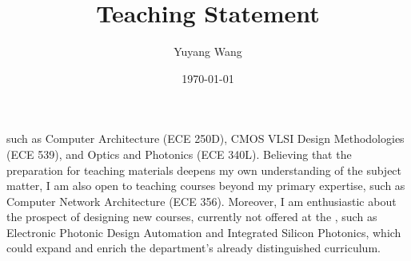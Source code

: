 



\title{Teaching Statement}

\def\courseOneName{Computer Architecture}
\def\courseOneNumber{ECE 250D}
\def\courseTwoName{CMOS VLSI Design Methodologies}
\def\courseTwoNumber{ECE 539}
\def\courseThreeName{Optics and Photonics}
\def\courseThreeNumber{ECE 340L}
\def\courseFourName{Computer Network Architecture}
\def\courseFourNumber{ECE 356}
\def\courseSixName{Electronic Photonic Design Automation}
\def\courseSevenName{Integrated Silicon Photonics}

\def\rsCustom{%
such as \courseOneName{} (\courseOneNumber{}), \courseTwoName{} (\courseTwoNumber{}), and \courseThreeName{} (\courseThreeNumber{}). Believing that the preparation for teaching materials deepens my own understanding of the subject matter, I am also open to teaching courses beyond my primary expertise, such as \courseFourName{} (\courseFourNumber{}). Moreover, I am enthusiastic about the prospect of designing new courses, currently not offered at the \appSchool{}, such as \courseSixName{} and \courseSevenName{}, which could expand and enrich the department's already distinguished curriculum.
}

\author{Yuyang Wang}
\date{\today}
\makeatletter
\fancyfoot[L]{\scshape \MakeLowercase{\@author}}
\fancyfoot[R]{{\scshape \MakeLowercase{\@title}}\quad{\LARGE\sfrac{\thepage}{\pageref*{LastPage}}}}
\makeatother



\maketitle%
\thispagestyle{fancy}


\rsCustom{}


\footnotesize


